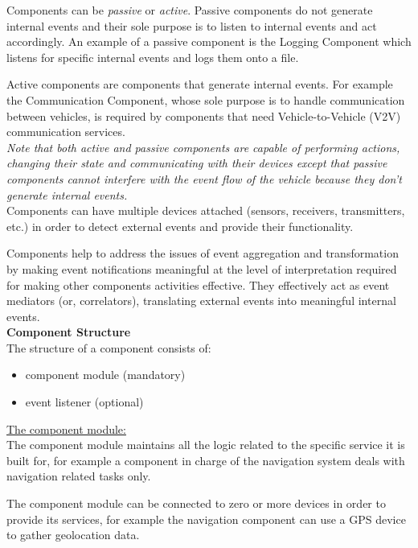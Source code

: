 \documentclass{memoir}
\begin{document}
Components can be \textit{passive} or \textit{active}. Passive components do not generate internal events and their sole purpose is to listen to internal events and act accordingly. An example of a passive component is the Logging Component which listens for specific internal events and logs them onto a file.

Active components are components that generate internal events. For example the Communication Component, whose sole purpose is to handle communication between vehicles, is required by components that need Vehicle-to-Vehicle (V2V) communication services.
\\

\textit{Note that both active and passive components are capable of performing actions, changing their state and communicating with their devices except that passive components cannot interfere with the event flow of the vehicle because they don't generate internal events.}
\\

Components can have multiple devices attached (sensors, receivers, transmitters, etc.) in order to detect external events and provide their functionality.

Components help to address the issues of event aggregation and transformation by making event notifications meaningful at the level of interpretation required for making other components activities effective. They effectively act as event mediators (or, correlators), translating external events into meaningful internal events.
\\
\newline
\textbf{Component Structure}
\\
\newline
The structure of a component consists of: 
\begin{itemize}
	\item component module (mandatory)
	\item event listener (optional)
\end{itemize}

\underline{The component module:}
\\
The component module maintains all the logic related to the specific service it is built for, for example a component in charge of the navigation system deals with navigation related tasks only.

The component module can be connected to zero or more devices in order to provide its services, for example the navigation component can use a GPS device to gather geolocation data. 
\\
\end{document}
